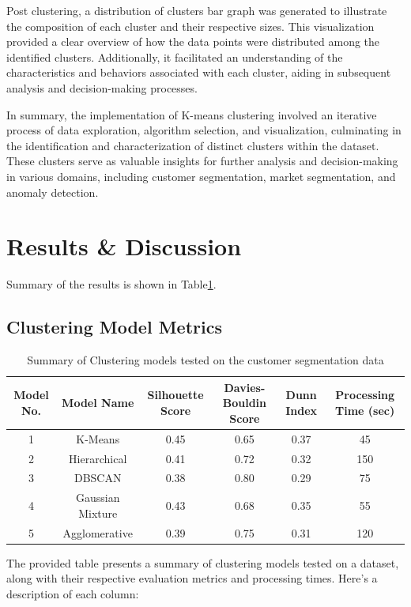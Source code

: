 \documentclass{josis}
\begin{document}
Post clustering, a distribution of clusters bar graph was generated to illustrate the composition of each cluster and their respective sizes. This visualization provided a clear overview of how the data points were distributed among the identified clusters. Additionally, it facilitated an understanding of the characteristics and behaviors associated with each cluster, aiding in subsequent analysis and decision-making processes.

In summary, the implementation of K-means clustering involved an iterative process of data exploration, algorithm selection, and visualization, culminating in the identification and characterization of distinct clusters within the dataset. These clusters serve as valuable insights for further analysis and decision-making in various domains, including customer segmentation, market segmentation, and anomaly detection.

\section{Results \& Discussion}

Summary of the results is shown in Table\ref{tab:large-model}.

\subsection{Clustering Model Metrics}

\begin{table}%
\centering
\caption{Summary of Clustering models tested on the customer segmentation data }
\label{tab:large-model}
 \begin{tabular}{@{}|c|c|c|c|c|c|@{}}
    \toprule
    Model No. & Model Name & Silhouette Score & Davies-Bouldin Score & Dunn Index & Processing Time (sec) \\
    \midrule
    1 & K-Means & 0.45 & 0.65 & 0.37 & 45 \\
    2 & Hierarchical & 0.41 & 0.72 & 0.32 & 150 \\
    3 & DBSCAN & 0.38 & 0.80 & 0.29 & 75 \\
    4 & Gaussian Mixture & 0.43 & 0.68 & 0.35 & 55 \\
    5 & Agglomerative & 0.39 & 0.75 & 0.31 & 120 \\
    \bottomrule
  \end{tabular}
\end{table}                                                                                                                                                                                                                                                                                             
The provided table presents a summary of clustering models tested on a dataset, along with their respective evaluation metrics and processing times. Here's a description of each column:
\end{document}
